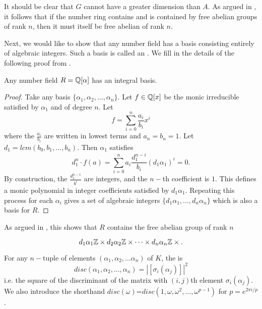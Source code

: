 It should be clear that $G$ cannot have a greater dimension than $A$. As argued in \cite{NumberFields}, it follows that if the number ring contains and is contained by free abelian groups of rank $n$, then it must itself be free abelian of rank $n.$

Next, we would like to show that any number field has a basis consisting entirely of algebraic integers. Such a basis is called an . We fill in the details of the following proof from \cite{NumberFields}.

\begin{proposition}
Any number field $R=\mathbb{Q}[\alpha]$ has an integral basis.
\end{proposition}
\begin{proof}
Take any basis $\{\alpha_1,\alpha_2,\dots,\alpha_n\}$. Let $f\in \mathbb{Q}[x]$ be the monic irreducible satisfied by $\alpha_1$ and of degree $n$. Let
$$f=\sum_{i=0}^{n}\frac{a_i}{b_i}x^i$$
where the $\frac{a_i}{b_i}$ are written in lowest terms and $a_n=b_n=1$. Let $d_1=lcm(b_0,b_1,\dots,b_n)$. Then $\alpha_1$ satisfies $$d_1^n\cdot f(a)=\sum_{i=0}^n a_i \frac{d_1^{n-i}}{b_i}(d_1\alpha_1)^i=0.$$
By construction, the $\frac{d_1^{n-1}}{b^i}$ are integers, and the $n-$th coefficient is $1$. This defines a monic polynomial in integer coefficients satisfied by $d_1\alpha_1$. Repeating this process for each $\alpha_i$ gives a set of algebraic integers $\{d_1\alpha_1,\dots,d_n\alpha_n\}$ which is also a basis for $R$.
\end{proof}

As argued in \cite{NumberFields}, this shows that $R$ contains the free abelian group of rank $n$

$$d_1\alpha_1\mathbb{Z}\times d_2\alpha_2\mathbb{Z}\times \dots \times d_n\alpha_n\mathbb{Z}\times.$$

\begin{definition}
For any $n-$tuple of elements $(\alpha_1,\alpha_2,\dots \alpha_n)$ of $K$, the  is 
$$disc(\alpha_1,\alpha_2,\dots,\alpha_n)=|[\sigma_i(\alpha_j)]|^2$$
i.e. the square of the discriminant of the matrix with $(i,j)$th element $\sigma_i(\alpha_j)$. We also introduce the shorthand $disc(\omega)$=$disc(1,\omega,\omega^2,\dots,\omega^{p-1})$ for $p=e^{2\pi i/p}$.
\end{definition}

